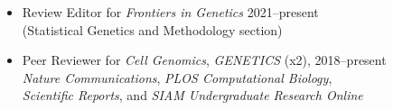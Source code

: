 \documentclass[margin]{res}
\begin{document}
\begin{resume}
\begin{itemize}
	\item Review Editor for \textit{Frontiers in Genetics}   \hfill 2021--present \\ (Statistical Genetics and Methodology section)
	\item Peer Reviewer for \textit{Cell Genomics}, \textit{GENETICS} (x2),   \hfill 2018--present \\ \textit{Nature Communications}, \textit{PLOS Computational Biology},  \\ \textit{Scientific Reports},  and \textit{SIAM Undergraduate Research Online} 
	\end{itemize}
	

\end{resume}
\end{document}
